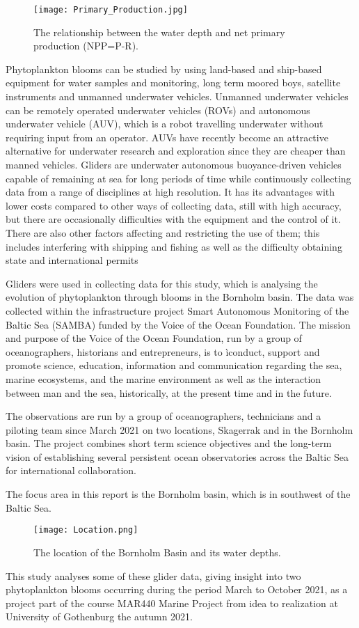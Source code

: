 \documentclass[../Main.tex]{subfiles}
\begin{document}
\begin{figure}[H]
\texttt{[image: Primary\_Production.jpg]}
\caption{ The relationship between the water depth and net primary production (NPP=P-R).\supercite{}}
\end{figure}

Phytoplankton blooms can be studied by using land-based and ship-based equipment for water samples and monitoring, long term moored boys, satellite instruments and unmanned underwater vehicles.\supercite{}
Unmanned underwater vehicles can be remotely operated underwater vehicles (ROVs) and autonomous underwater vehicle (AUV), 
which is a robot travelling underwater without requiring input from an operator. 
AUVs have recently become an attractive alternative for underwater research and exploration since they are cheaper than manned vehicles. 
Gliders are underwater autonomous buoyance-driven vehicles capable of remaining at sea for long periods of time while continuously collecting data from a range of disciplines at high resolution. 
It has its advantages with lower costs compared to other ways of collecting data, still with high accuracy, but there are occasionally difficulties with the equipment and the control of it. 
There are also other factors affecting and restricting the use of them; this includes interfering with shipping and fishing as well as the difficulty obtaining state and international permits

Gliders were used in collecting data for this study, which is analysing the evolution of phytoplankton through blooms in the Bornholm basin. 
The data was collected within the infrastructure project Smart Autonomous Monitoring of the Baltic Sea (SAMBA) funded by the Voice of the Ocean Foundation. 
The mission and purpose of the Voice of the Ocean Foundation, run by a group of oceanographers, historians and entrepreneurs, is to ìconduct, 
support and promote science, education, information and communication regarding the sea, marine ecosystems, 
and the marine environment as well as the interaction between man and the sea, historically, at the present time and in the future.\supercite{}

The observations are run by a group of oceanographers, technicians and a piloting team since March 2021 on two locations, Skagerrak and in the Bornholm basin. 
The project combines short term science objectives and the long-term vision of establishing several persistent ocean observatories across the Baltic Sea for international collaboration.\supercite{}

The focus area in this report is the Bornholm basin, which is in southwest of the Baltic Sea. 

\begin{figure}[H]
\texttt{[image: Location.png]}
\caption{The location of the Bornholm Basin and its water depths.\supercite{}}
\end{figure}

This study analyses some of these glider data, giving insight into two phytoplankton blooms occurring during the period March to October 2021, 
as a project part of the course MAR440 Marine Project from idea to realization at University of Gothenburg the autumn 2021.
\end{document}
